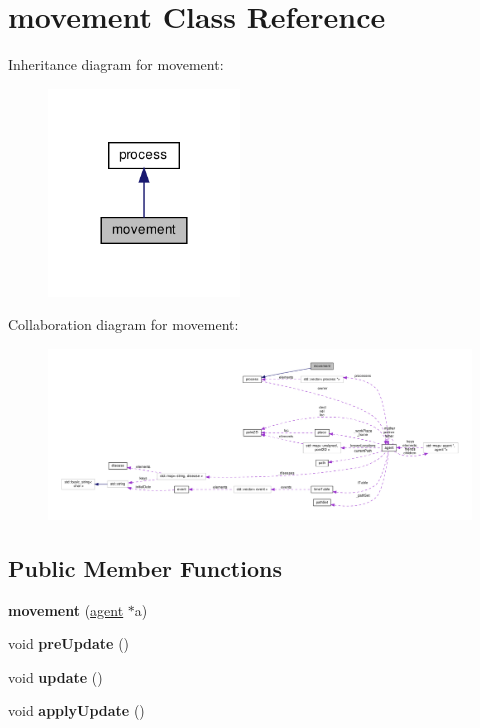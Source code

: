 \hypertarget{classmovement}{}\section{movement Class Reference}
\label{classmovement}


Inheritance diagram for movement\+:
\nopagebreak
\begin{figure}[H]
\begin{center}
\leavevmode
\includegraphics[width=144pt]{classmovement__inherit__graph}
\end{center}
\end{figure}


Collaboration diagram for movement\+:
\nopagebreak
\begin{figure}[H]
\begin{center}
\leavevmode
\includegraphics[width=350pt]{classmovement__coll__graph}
\end{center}
\end{figure}
\subsection*{Public Member Functions}
\begin{DoxyCompactItemize}
\item 
\mbox{\label{classmovement_aed3c0d8fffab4ddfcf671869eb3167fd}} 
{\bfseries movement} (\mbox{\hyperlink{classagent}{agent}} $\ast$a)
\item 
\mbox{\label{classmovement_aad069c445064e63352ae38b00deec2a9}} 
void {\bfseries pre\+Update} ()
\item 
\mbox{\label{classmovement_affebcf78f2f1f085a8daae74f699a132}} 
void {\bfseries update} ()
\item 
\mbox{\label{classmovement_a2b5e033ddb01a6df13826d9e3f2b253c}} 
void {\bfseries apply\+Update} ()
\end{DoxyCompactItemize}
